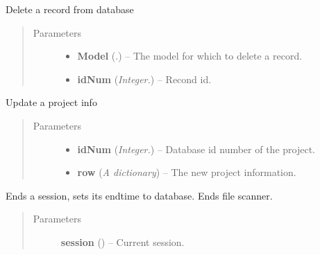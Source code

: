 \documentclass[letterpaper,10pt,english]{sphinxmanual}
\begin{document}
\begin{fulllineitems}
\label{api:controller.DeleteRecord}
Delete a record from database
\begin{quote}\begin{description}
\item[{Parameters}] \leavevmode\begin{itemize}
\item {} 
\textbf{Model} (.) -- The model for which to delete a record.

\item {} 
\textbf{idNum} (\emph{Integer.}) -- Recond id.

\end{itemize}

\end{description}\end{quote}

\end{fulllineitems}


\begin{fulllineitems}
\label{api:controller.EditProject}
Update a project info
\begin{quote}\begin{description}
\item[{Parameters}] \leavevmode\begin{itemize}
\item {} 
\textbf{idNum} (\emph{Integer.}) -- Database id number of the project.

\item {} 
\textbf{row} (\emph{A dictionary}) -- The new project information.

\end{itemize}

\end{description}\end{quote}

\end{fulllineitems}


\begin{fulllineitems}
\label{api:controller.EndSession}
Ends a session, sets its endtime to database. Ends file scanner.
\begin{quote}\begin{description}
\item[{Parameters}] \leavevmode
\textbf{session} ({\hyperref[api:models.Session]{}}) -- Current session.

\end{description}\end{quote}

\end{fulllineitems}
\end{document}
